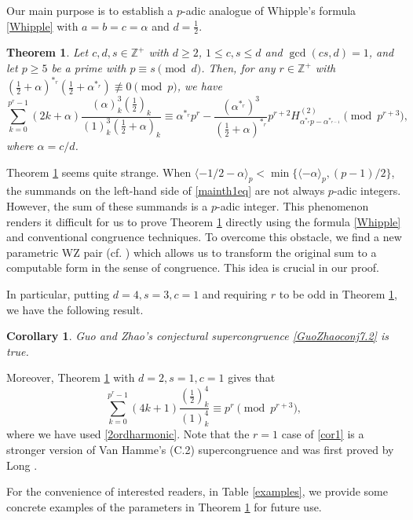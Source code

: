 \documentclass[12pt,reqno]{amsart}
\def\f{\frac}
\def\eq{\equiv}
\def\Z{\mathbb Z}
\def\<{\langle}
\def\>{\rangle}
\theoremstyle{plain}
\newtheorem{theorem}{Theorem}[section]
\newtheorem{corollary}{Corollary}[section]
\theoremstyle{definition}
\theoremstyle{remark}
\numberwithin{equation}{section}
\begin{document}
Our main purpose is to establish a $p$-adic analogue of Whipple's formula \eqref{Whipple} with $a=b=c=\alpha$ and $d=\f12$.

\begin{theorem}\label{mainth1}
Let $c,d,s\in\Z^+$ with $d\geq 2$, $1\leq c,s\leq d$ and $\gcd(cs,d)=1$, and let $p\geq5$ be a prime with $p\eq s\pmod d$. Then, for any $r\in\Z^+$ with $(\f12+\alpha)^{\ast_r}(\f12+\alpha^{\ast_r})\not\eq0\pmod{p}$,  we have
\begin{equation}\label{mainth1eq}
\sum_{k=0}^{p^r-1}(2k+\alpha)\f{(\alpha)_k^3(\f12)_k}{(1)_k^3(\f12+\alpha)_k}\eq \alpha^{\ast_r}p^r -\f{(\alpha^{\ast_r})^3}{(\f12+\alpha)^{\ast_r}}p^{r+2}H_{\alpha^{\ast_r}p-\alpha^{\ast_{r-1}}}^{(2)}\pmod{p^{r+3}},
\end{equation}
where $\alpha=c/d$.
\end{theorem}

Theorem \ref{mainth1} seems quite strange. When $\<-1/2-\alpha\>_p<\min\{\<-\alpha\>_p,(p-1)/2\}$, the summands on the left-hand side of \eqref{mainth1eq} are not always $p$-adic integers. However, the sum of these summands is a $p$-adic integer. This phenomenon renders it difficult for us to prove Theorem \ref{mainth1} directly using the formula \eqref{Whipple} and conventional congruence techniques. To overcome this obstacle, we find a new parametric WZ pair (cf. \cite{PWZ}) which allows us to transform the original sum to a computable form in the sense of congruence. This idea is crucial in our proof.

In particular, putting $d=4,s=3,c=1$ and requiring $r$ to be odd in Theorem \ref{mainth1}, we have the following result.
\begin{corollary}\label{cor}
Guo and Zhao's conjectural supercongruence \eqref{GuoZhaoconj7.2} \cite[Conjecture 7.2]{Guo-Zhao2026} is true.
\end{corollary}
Moreover, Theorem \ref{mainth1} with $d=2,s=1,c=1$ gives that
\begin{equation}\label{cor1}
\sum_{k=0}^{p^r-1}(4k+1)\f{(\f12)_k^4}{(1)_k^4}\eq p^r \pmod{p^{r+3}},
\end{equation}
where we have used \eqref{2ordharmonic}. Note that the $r=1$ case of \eqref{cor1} is a stronger version of Van Hamme's (C.2) supercongruence \cite{VanHamme1997} and was first proved by Long \cite{Long2011}. 

For the convenience of interested readers, in Table \ref{examples}, we provide some concrete examples of the parameters in Theorem \ref{mainth1} for future use.
\end{document}
